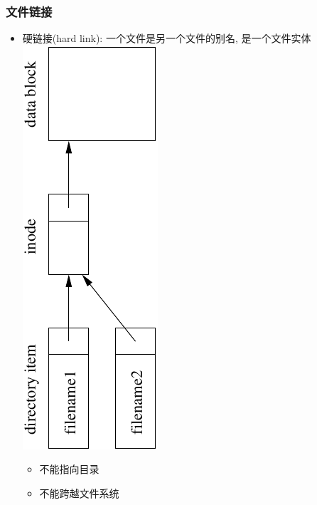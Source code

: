 \documentclass[compress]{beamer}
\begin{document}
\begin{frame}
\frametitle{文件链接}

\begin{itemize}
\item 硬链接(hard link): 一个文件是另一个文件的别名, 是一个文件实体
\includegraphics[scale=1.0,angle=-90]{ln.pdf}
\begin{itemize}
\item 不能指向目录
\item 不能跨越文件系统
\end{itemize}

\end{itemize}


\end{frame}
\end{document}
